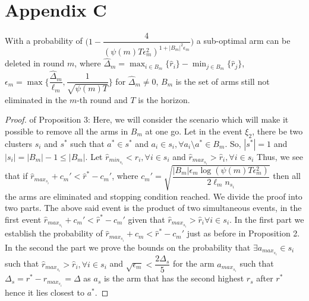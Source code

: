 \section*{Appendix C}
\begin{proposition}
With a probability of $\bigg(1-\dfrac{4}{(\psi(m)T\epsilon_{m}^{2})^{1+|B_{m}|^{2}\epsilon_{m}}}\bigg)$ a sub-optimal arm can be deleted in round $m$, where $\hat{\Delta}_{m}=\max_{i\in B_{m}}{\lbrace\hat{r}_{i}\rbrace}-\min_{j\in B_{m}}{\lbrace\hat{r}_{j}\rbrace}$,  $\epsilon_{m}=\max{\bigg\lbrace\dfrac{\hat{\Delta}_{m}}{\ell_{m}}, \dfrac{1}{\sqrt{\psi{(m)T}}}\bigg\rbrace}$ for $\hat{\Delta}_{m}\neq 0$, $B_{m}$ is the set of arms still not eliminated in the $m$-th round and $T$ is the horizon.
\end{proposition}

\begin{proof} of Proposition 3:
\newline
Here, we will consider the scenario which will make it possible to remove all the arms in $B_{m}$ at one go. Let in the event $\xi_{2}$, there be two clusters $s_{i}$ and $s^{*}$ such that $a^{*}\in s^{*}$ and $a_{i}\in s_{i}, \forall a_{i}\setminus a^{*}\in B_{m}$. So, $|s^{*}|=1$ and $|s_{i}|=|B_{m}|-1\leq |B_{m}|$. Let $\hat{r}_{min_{s_{i}}}<\hat{r}_{i},\forall i\in s_{i}$ and $\hat{r}_{max_{s_{i}}}>\hat{r}_{i},\forall i\in s_{i}$ Thus, we see that if
\newline
\hspace*{2em} $\hat{r}_{max_{s_{i}}}+c_{m}' < \hat{r}^{*}-c_{m}' $, where $c_{m}'=\sqrt{\dfrac{|B_{m}|\epsilon_{m}\log{(\psi(m)T\epsilon_{m}^{2})}}{2\ell_{m} n_{s_{i}}}}$
\newline
then all the arms are eliminated and stopping condition reached. 
We divide the proof into two parts. The above said event is the product of two simultaneous events, in the first event $\hat{r}_{max_{s_{i}}}+c_{m}' < \hat{r}^{*}-c_{m}'$ given that $\hat{r}_{max_{s_{i}}}>\hat{r}_{i}\forall i \in s_{i}$. In the first part we establish the probability of $\hat{r}_{max_{s_{i}}}+c_{m} < \hat{r}^{*}-c_{m}'$ just as before in Proposition 2. In the second the part we prove the bounds on the probability that $\exists a_{max_{s_{i}}}\in s_{i}$ such that $\hat{r}_{max_{s_{i}}}>\hat{r}_{i},\forall i \in s_{i}$ and $\sqrt{\epsilon_{m}}<\dfrac{2\Delta_{s}}{5}$ for the arm $a_{max_{s_{i}}}$ such that $\Delta_{s}=r^{*}-r_{max_{s_{i}}}=\Delta$ as $a_{s}$ is the arm that has the second highest $r_{s}$ after $r^{*}$ hence it lies closest to $a^{*}$.

\end{proof}
